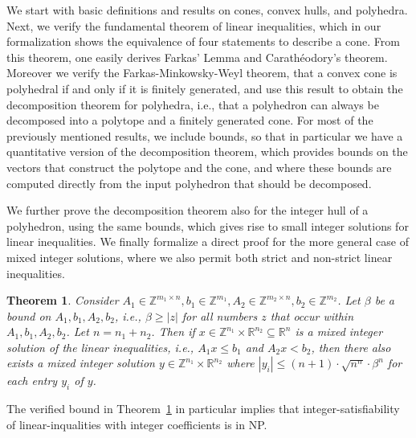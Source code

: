\documentclass[11pt,a4paper]{article}
\newcommand\ints{\mathbb{Z}}
\newcommand\reals{\mathbb{R}}
\newtheorem{theorem}{Theorem}
\begin{document}
We start with basic definitions and results on cones, convex hulls, and polyhedra.
Next, we verify the fundamental theorem of linear inequalities, which in
our formalization shows the equivalence of four statements to describe a cone. 
From this theorem, one easily derives Farkas' Lemma and Carath\'eodory's theorem.
Moreover we verify the Farkas-Minkowsky-Weyl theorem, that a convex cone is polyhedral if and only if
it is finitely generated, and use this result to obtain 
the decomposition theorem for polyhedra, i.e., that a polyhedron can always be decomposed into
a polytope and a finitely generated cone. 
For most of the previously mentioned results, we include bounds, so that in particular we have a
quantitative version of the decomposition theorem, which provides bounds on the vectors that construct
the polytope and the cone, and where these bounds are 
computed directly from the input polyhedron that should be decomposed.

We further prove the decomposition theorem also for the integer hull of a polyhedron, using the same bounds,
which gives rise to small integer solutions for linear inequalities. We finally formalize a direct proof
for the more general case of mixed integer solutions, where we also permit both strict and non-strict 
linear inequalities. 

\begin{theorem}
\label{thm}
Consider  
$A_1 \in \ints^{m_1 \times n}, b_1 \in \ints^{m_1}, A_2 \in \ints^{m_2 \times n}, b_2 \in \ints^{m_2}$.
Let $\beta$ be a bound on $A_1,b_1,A_2,b_2$, i.e., $\beta \geq |z|$ for all numbers $z$ that occur within $A_1,b_1,A_2,b_2$. Let $n = n_1+n_2$.
Then if $x \in \ints^{n_1} \times \reals^{n_2} \subseteq \reals^n$ is a mixed integer solution of the linear inequalities, i.e., 
$A_1x \leq b_1$ and $A_2x < b_2$, then there also exists a mixed integer solution 
$y \in \ints^{n_1} \times \reals^{n_2}$ where 
$|y_i| \leq (n+1) \cdot \sqrt{n^n} \cdot\beta^n$ for each entry $y_i$ of $y$.
\end{theorem}

The verified bound in Theorem~\ref{thm} in particular implies that integer-satisfiability
of linear-inqualities with integer coefficients is in NP.







\end{document}
